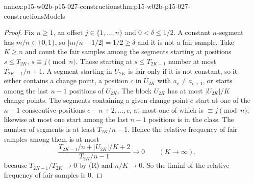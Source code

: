 \begin{annexitem}{annex:p15-w02b-p15-027-constructions}{thm:p15-w02b-p15-027-constructions}{Models}
\begin{proof}
Fix \(n\geq1\), an offset \(j\in\{1,\ldots,n\}\) and
\(0<\delta\leq1/2\). A constant \(n\)-segment has \(m/n\in\{0,1\}\), so
\(|m/n-1/2|=1/2\geq\delta\) and it is not a fair sample. Take \(K\geq n\)
and count the fair samples among the segments starting at positions
\(s\leq T_{2K}\), \(s\equiv j\pmod n\). Those starting at \(s\leq
T_{2K-1}\) number at most \(T_{2K-1}/n+1\). A segment starting in
\(U_{2K}\) is fair only if it is not constant, so it either contains a
change point, a position \(c\) in \(U_{2K}\) with \(a_c\neq a_{c+1}\), or
starts among the last \(n-1\) positions of \(U_{2K}\). The block
\(U_{2K}\) has at most \(|U_{2K}|/K\) change points. The segments
containing a given change point \(c\) start at one of the \(n-1\)
consecutive positions \(c-n+2,\ldots,c\), at most one of which is
\(\equiv j\pmod n\); likewise at most one start among the last \(n-1\)
positions is in the class. The number of segments is at least
\(T_{2K}/n-1\). Hence the relative frequency of fair samples among them is
at most
\[
 \frac{T_{2K-1}/n+|U_{2K}|/K+2}{T_{2K}/n-1}
 \longrightarrow0\qquad(K\to\infty),
\]
because \(T_{2K-1}/T_{2K}\to0\) by (R) and \(n/K\to0\). So the liminf of
the relative frequency of fair samples is \(0\).
\end{proof}
\end{annexitem}

